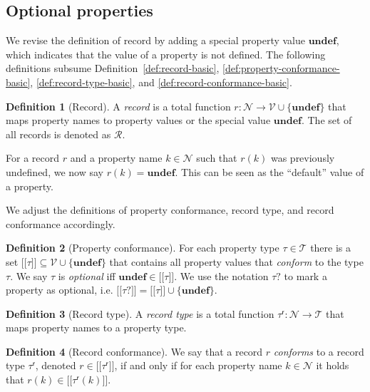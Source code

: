 \documentclass{article}
\theoremstyle{definition}
\newtheorem{definition}{Definition}
\newcommand{\ptype}{\tau}
\newcommand{\ptypes}{\mathcal{T}}
\newcommand{\rtype}{\tau^\mathsf{r}}
\newcommand{\lsem}{\ensuremath{[\![}}
\newcommand{\rsem}{\ensuremath{]\!]}}
\newcommand{\sem}[1]{\ensuremath{\lsem #1 \rsem}}
\newcommand{\undefined}{\mathbf{undef}}
\begin{document}
\subsection{Optional properties}
\label{sec:optional-properties}

We revise the definition of record by adding a special property value $\undefined$, which indicates that the value of a property is not defined. The following definitions subsume Definition~\ref{def:record-basic}, \ref{def:property-conformance-basic}, \ref{def:record-type-basic}, and \ref{def:record-conformance-basic}.

\begin{definition}[Record]
  \label{def:record}
  A \emph{record} is a total function $r : \mathcal{N} \to \mathcal{V} \cup \{\undefined\}$ that maps property names to property values or the special value $\undefined$. The set of all records is denoted as $\mathcal{R}$.
\end{definition}

For a record $r$ and a property name $k \in \mathcal{N}$ such that $r(k)$ was previously undefined, we now say $r(k) = \undefined$. This can be seen as the ``default'' value of a property.

We adjust the definitions of property conformance, record type, and record conformance accordingly.

\begin{definition}[Property conformance]
  \label{def:property-conformance}
  For each property type $\ptype \in \ptypes$ there is a set $\sem{\ptype} \subseteq \mathcal{V} \cup \{\undefined\}$ that contains all property values that \emph{conform} to the type $\ptype$. We say $\ptype$ is \emph{optional} iff $\undefined \in \sem{\ptype}$. We use the notation $\ptype?$ to mark a property as optional, i.e. $\sem{\ptype?} = \sem{\ptype} \cup \{ \undefined \}$.
\end{definition}

\begin{definition}[Record type]
  \label{def:record-type}
  A \emph{record type} is a total function $\rtype : \mathcal{N} \to \ptypes$ that maps property names to a property type.
\end{definition}

\begin{definition}[Record conformance]
  \label{def:record-conformance}
  We say that a record $r$ \emph{conforms} to a record type $\rtype$, denoted $r \in \sem{\rtype}$, if and only if for each property name $k \in \mathcal{N}$ it holds that $r(k) \in \sem{\rtype(k)}$.
\end{definition}
\end{document}
